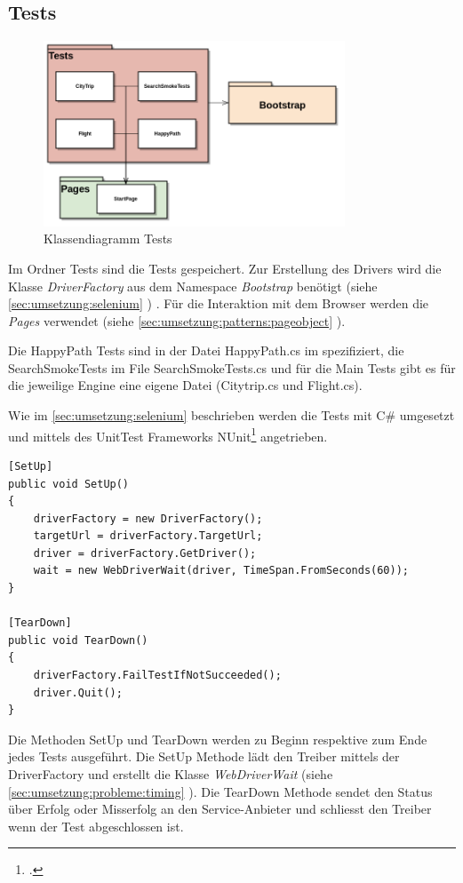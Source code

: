 \subsection{Tests}
\begin{figure}[H]
	\centering
	\includegraphics[width=0.8\textwidth]{images/semesterarbeit class diagram - tests.png}
	\caption{Klassendiagramm Tests}
	\label{fig:umsetzung:architektur:tests}
\end{figure}
Im Ordner Tests sind die Tests gespeichert. Zur Erstellung des Drivers wird die Klasse \textit{DriverFactory} aus dem Namespace \textit{Bootstrap} benötigt (siehe \cref{sec:umsetzung:selenium} ) . Für die Interaktion mit dem Browser werden die \textit{Pages} verwendet (siehe \cref{sec:umsetzung:patterns:pageobject} ).

Die HappyPath Tests sind in der Datei HappyPath.cs im spezifiziert, die SearchSmokeTests im File SearchSmokeTests.cs und für die Main Tests gibt es für die jeweilige Engine eine eigene Datei (Citytrip.cs und Flight.cs).

Wie im \cref{sec:umsetzung:selenium}  beschrieben werden die Tests mit C\# umgesetzt und mittels des UnitTest Frameworks NUnit\footcite{NUnit_-_Home_2015-09-26} angetrieben.

\begin{lstlisting}
[SetUp]
public void SetUp()
{
    driverFactory = new DriverFactory();
    targetUrl = driverFactory.TargetUrl;
    driver = driverFactory.GetDriver();
    wait = new WebDriverWait(driver, TimeSpan.FromSeconds(60));
}

[TearDown]
public void TearDown()
{
    driverFactory.FailTestIfNotSucceeded();
    driver.Quit();
}
\end{lstlisting}

Die Methoden SetUp und TearDown werden zu Beginn respektive zum Ende jedes Tests ausgeführt. Die SetUp Methode lädt den Treiber mittels der DriverFactory und erstellt die Klasse \textit{WebDriverWait} (siehe \cref{sec:umsetzung:probleme:timing} ). Die TearDown Methode sendet den Status über Erfolg oder Misserfolg an den Service-Anbieter und schliesst den Treiber wenn der Test abgeschlossen ist.

